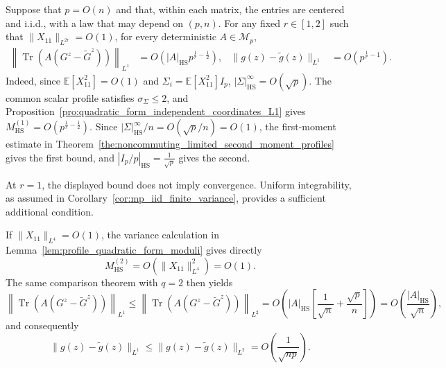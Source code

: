 \documentclass[EJP, preprint, NODS, nobera, nofontexpansion]{ejpecp}
\DeclareMathOperator{\tr}{Tr}
\DeclareMathOperator{\hs}{HS}
\begin{document}
\begin{remark}
\label{rem:iid_finite_moment_rates}
Suppose that $p=O(n)$ and that, within each matrix, the entries are
centered and i.i.d., with a law that may depend on $(p,n)$.
For any fixed $r\in[1, 2]$ such that $\|X_{11}\|_{L^{2r}}=O(1)$, for every deterministic
$A\in\mathcal M_p$,
\begin{align*}
    \left\|\tr\left(A(G^z-\tilde G^z)\right)\right\|_{L^1}
    &=O\left(|A|_{\hs}p^{\frac{1}{r}-\frac{1}{2}}\right),
    &
    \|g(z)-\tilde g(z)\|_{L^1}
    &=O\left(p^{\frac{1}{r}-1}\right).
\end{align*}
Indeed, since
$\mathbb E[X_{11}^2]=O(1)$ and
$\Sigma_i=\mathbb E[X_{11}^2]I_p$, 
$|\Sigma|_{\hs}^\infty=O(\sqrt p)$.
The common scalar profile satisfies $\sigma_\Sigma\leq2$, and
Proposition~\ref{pro:quadratic_form_independent_coordinates_L1} gives
$M_{\hs}^{(1)}=O(p^{\frac{1}{r}-\frac{1}{2}})$. Since
$|\Sigma|_{\hs}^\infty/n=O(\sqrt p/n)=O(1)$,
the first-moment estimate in
Theorem~\ref{the:noncommuting_limited_second_moment_profiles} gives the
first bound, and $|I_p/p|_{\hs}=\frac1{\sqrt p}$ gives the second.

At \(r=1\), the displayed bound does not imply convergence. Uniform integrability, as assumed in Corollary~\ref{cor:mp_iid_finite_variance}, provides a sufficient additional condition.

If $\|X_{11}\|_{L^4}=O(1)$, the variance calculation in
Lemma~\ref{lem:profile_quadratic_form_moduli} gives directly
\[
    M_{\hs}^{(2)}=O(\|X_{11}\|_{L^4}^2)=O(1).
\]
The same comparison theorem with $q=2$
then yields
\[
    \left\|\tr\left(A(G^z-\tilde G^z)\right)\right\|_{L^1}
    \leq \left\|\tr\left(A(G^z-\tilde G^z)\right)\right\|_{L^2}
    =O\left(
        |A|_{\hs}\left[\frac1{\sqrt n}+\frac{\sqrt p}{n}\right]
      \right)
    =O\left(\frac{|A|_{\hs}}{\sqrt n}\right),
\]
and consequently
\[
    \|g(z)-\tilde g(z)\|_{L^1}
    \leq\|g(z)-\tilde g(z)\|_{L^2}
    =O\left(\frac1{\sqrt{np}}\right).
\]
\end{remark}

\clearpage
\end{document}
